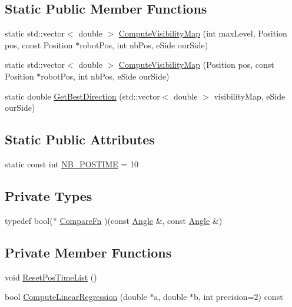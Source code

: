 \subsection*{Static Public Member Functions}
\begin{DoxyCompactItemize}
\item 
static std::vector$<$ double $>$ \hyperlink{classBallMonitor_a0d2ef73ba2b0573021c800c311e08245}{ComputeVisibilityMap} (int maxLevel, Position pos, const Position $\ast$robotPos, int nbPos, eSide ourSide)
\item 
static std::vector$<$ double $>$ \hyperlink{classBallMonitor_a53e07299cf403dd036cab543d37fbf92}{ComputeVisibilityMap} (Position pos, const Position $\ast$robotPos, int nbPos, eSide ourSide)
\item 
static double \hyperlink{classBallMonitor_a9045d5d3abf9c9b549303c831b3387e0}{GetBestDirection} (std::vector$<$ double $>$ visibilityMap, eSide ourSide)
\end{DoxyCompactItemize}
\subsection*{Static Public Attributes}
\begin{DoxyCompactItemize}
\item 
static const int \hyperlink{classBallMonitor_a6603291a8d6c6a2de7b378ece54d5e2b}{NB\_\-POSTIME} = 10
\end{DoxyCompactItemize}
\subsection*{Private Types}
\begin{DoxyCompactItemize}
\item 
typedef bool($\ast$ \hyperlink{classBallMonitor_a5ad781c99d5b43bee7c838de9da75527}{CompareFn} )(const \hyperlink{structBallMonitor_1_1Angle}{Angle} \&, const \hyperlink{structBallMonitor_1_1Angle}{Angle} \&)
\end{DoxyCompactItemize}
\subsection*{Private Member Functions}
\begin{DoxyCompactItemize}
\item 
void \hyperlink{classBallMonitor_a09ed61cf1852d45f03e7aacdebfe0175}{ResetPosTimeList} ()
\item 
bool \hyperlink{classBallMonitor_a49645db55ca752adbc2a5a074c7314be}{ComputeLinearRegression} (double $\ast$a, double $\ast$b, int precision=2) const 
\end{DoxyCompactItemize}
